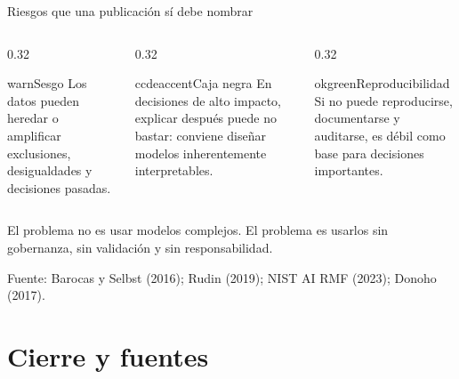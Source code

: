 \documentclass[aspectratio=169,11pt,table]{beamer}
\newcommand{\source}[1]{%
  \par\vspace{0.12cm}
  {\scriptsize\textcolor{ccdemid}{Fuente: #1}}%
}
\begin{document}
\begin{frame}{Riesgos que una publicación sí debe nombrar}
\begin{columns}[T,onlytextwidth]
\begin{column}{0.32\textwidth}
\begin{contrastbox}{warn}{Sesgo}
\small
Los datos pueden heredar o amplificar exclusiones, desigualdades y decisiones pasadas.
\end{contrastbox}
\end{column}
\begin{column}{0.32\textwidth}
\begin{contrastbox}{ccdeaccent}{Caja negra}
\small
En decisiones de alto impacto, explicar después puede no bastar: conviene diseñar modelos inherentemente interpretables.
\end{contrastbox}
\end{column}
\begin{column}{0.32\textwidth}
\begin{contrastbox}{okgreen}{Reproducibilidad}
\small
Si no puede reproducirse, documentarse y auditarse, es débil como base para decisiones importantes.
\end{contrastbox}
\end{column}
\end{columns}

\vspace{0.45cm}
\begin{keybox}
\centering
El problema no es usar modelos complejos. El problema es usarlos sin gobernanza, sin validación y sin responsabilidad.
\end{keybox}

\source{Barocas y Selbst (2016); Rudin (2019); NIST AI RMF (2023); Donoho (2017).}
\end{frame}

\section{Cierre y fuentes}
\end{document}
